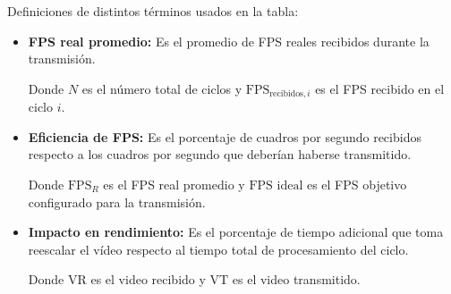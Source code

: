 Definiciones de distintos términos usados en la tabla:
\begin{itemize}
    \item \textbf{FPS real promedio:} Es el promedio de FPS reales recibidos durante la transmisión.
    
    \begin{center}
    \end{center}

    Donde \(N\) es el número total de ciclos y \(\text{FPS}_{\text{recibidos},i}\) es el FPS recibido en el ciclo \(i\).

    \item \textbf{Eficiencia de FPS:} Es el porcentaje de cuadros por segundo recibidos respecto a los cuadros por segundo que deberían haberse transmitido. 
    
    \begin{center}
    \end{center}
    
    Donde \(\text{FPS}_R\) es el FPS real promedio y \(\text{FPS}\text{~ideal}\) es el FPS objetivo configurado para la transmisión.

    \item \textbf{Impacto en rendimiento:} Es el porcentaje de tiempo adicional que toma reescalar el vídeo respecto al tiempo total de procesamiento del ciclo. 
 
    \begin{center}
    \end{center}
    Donde \(\text{VR}\) es el video recibido y \(\text{VT}\) es el video transmitido.
    
\end{itemize}

\newpage




